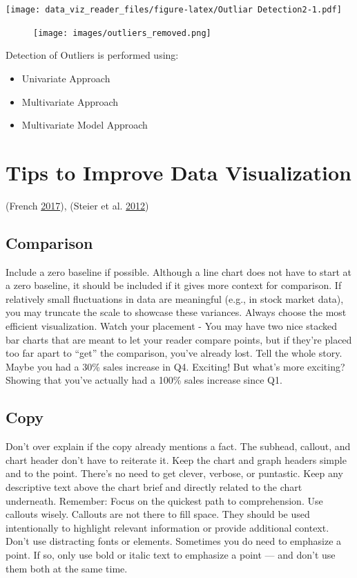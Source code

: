 \documentclass[]{book}
\providecommand{\tightlist}{%
  \setlength{\itemsep}{0pt}\setlength{\parskip}{0pt}}
\begin{document}
\texttt{[image: data\_viz\_reader\_files/figure-latex/Outliar Detection2-1.pdf]}

\begin{figure}
\centering
\texttt{[image: images/outliers\_removed.png]}
\caption{}
\end{figure}

Detection of Outliers is performed using:

\begin{itemize}
\tightlist
\item
  Univariate Approach
\item
  Multivariate Approach
\item
  Multivariate Model Approach
\end{itemize}

\section{Tips to Improve Data
Visualization}\label{tips-to-improve-data-visualization}

(French \protect\hyperlink{ref-French}{2017}), (Steier et al.
\protect\hyperlink{ref-Steier}{2012})

\subsection{Comparison}\label{comparison-1}

Include a zero baseline if possible. Although a line chart does not have
to start at a zero baseline, it should be included if it gives more
context for comparison. If relatively small fluctuations in data are
meaningful (e.g., in stock market data), you may truncate the scale to
showcase these variances. Always choose the most efficient
visualization. Watch your placement - You may have two nice stacked bar
charts that are meant to let your reader compare points, but if they're
placed too far apart to ``get'' the comparison, you've already lost.
Tell the whole story. Maybe you had a 30\% sales increase in Q4.
Exciting! But what's more exciting? Showing that you've actually had a
100\% sales increase since Q1.

\subsection{Copy}\label{copy}

Don't over explain if the copy already mentions a fact. The subhead,
callout, and chart header don't have to reiterate it. Keep the chart and
graph headers simple and to the point. There's no need to get clever,
verbose, or puntastic. Keep any descriptive text above the chart brief
and directly related to the chart underneath. Remember: Focus on the
quickest path to comprehension. Use callouts wisely. Callouts are not
there to fill space. They should be used intentionally to highlight
relevant information or provide additional context. Don't use
distracting fonts or elements. Sometimes you do need to emphasize a
point. If so, only use bold or italic text to emphasize a point --- and
don't use them both at the same time.
\end{document}
